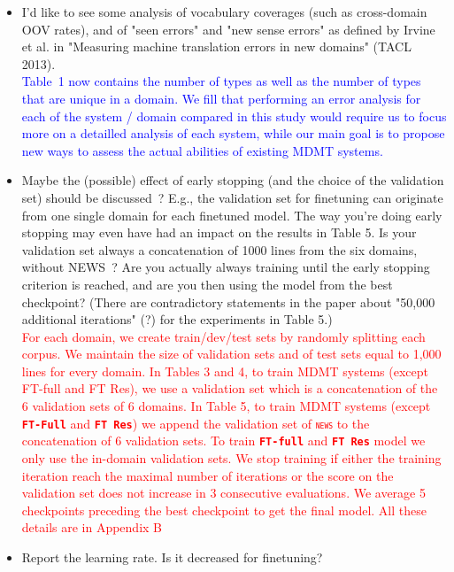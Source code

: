 \documentclass[12pt,times,a4paper,twoside]{article}
\newcommand{\fyTodo}[1]{\Todo[FY:]{\textcolor{orange}{#1}}}
\newcommand{\fyDone}[1]{\done[FY]\Todo[FY:]{\textcolor{orange}{#1}}}
\theoremstyle{definition}
\newcommand{\domain}[1]{\texttt{\textsc{#1}}}
\newcommand{\system}[1]{\texttt{\textbf{#1}}}
\begin{document}
\begin{itemize}
\item I'd like to see some analysis of vocabulary coverages (such as
cross-domain OOV rates), and of "seen errors" and "new sense errors" as defined by Irvine et al. in "Measuring machine translation errors in new domains" (TACL 2013).
\\
\textcolor{blue}{Table~1 now contains the number of types as well as the number of types that are unique in a domain. We fill that performing an error analysis for each of the system / domain compared in this study would require us to focus more on a detailled analysis of each system, while our main goal is to propose new ways to assess the actual abilities of existing MDMT systems.}\fyTodo{Will this be enough ?}
\\
\item Maybe the (possible) effect of early stopping (and the choice of the validation set) should be discussed~? E.g., the validation set for finetuning can originate from one single domain for each finetuned model. The way you're doing early stopping may even have had an impact on the results in Table 5. Is your validation set always a concatenation of 1000 lines from the six domains, without NEWS~? Are you actually always training until the early stopping criterion is reached, and are you then using the model from the best checkpoint? (There are contradictory statements in the paper about "50,000  additional iterations" (?) for the experiments in Table 5.)
\\
\textcolor{red}{For each domain, we create train/dev/test sets by randomly splitting each corpus. We maintain the size of validation sets and of test sets equal to 1,000 lines for every domain. In Tables 3 and 4, to train MDMT systems (except FT-full and FT Res), we use a validation set which is a concatenation of the 6 validation sets of 6 domains. In Table 5, to train MDMT systems (except \system{FT-Full} and \system{FT Res}) we append the validation set of \domain{news} to the concatenation of 6 validation sets. To train \system{FT-full} and \system{FT Res} model we only use the in-domain validation sets. We stop training if either the training iteration reach the maximal number of iterations or the score on the validation set does not increase in 3 consecutive evaluations. We average 5 checkpoints preceding the best checkpoint to get the final model. All these details are in Appendix B}\fyDone{up to the best ?}
\\
\item Report the learning rate. Is it decreased for finetuning?

\end{itemize}
\end{document}
